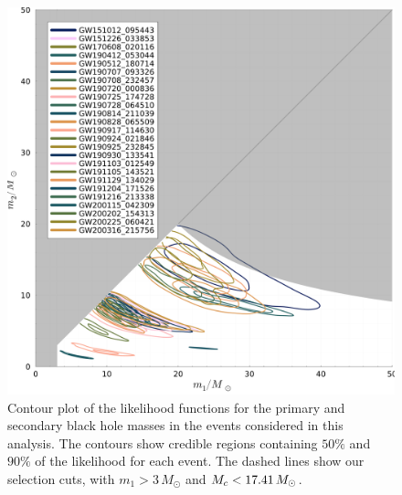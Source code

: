 \documentclass[modern]{aastex631}
\begin{document}
\begin{figure}
    \includegraphics[width=\columnwidth]{figures/m1-m2-contour.pdf}
    \caption{\label{fig:m1-m2-contour} Contour plot of the likelihood functions
    for the primary and secondary black hole masses in the events considered in
    this analysis.  The contours show credible regions containing $50\%$ and
    $90\%$ of the likelihood for each event.  The dashed lines show our
    selection cuts, with $m_1 > 3 \, M_\odot$ and $M_c <
    17.41 \, M_\odot$.}
\end{figure}
\end{document}
